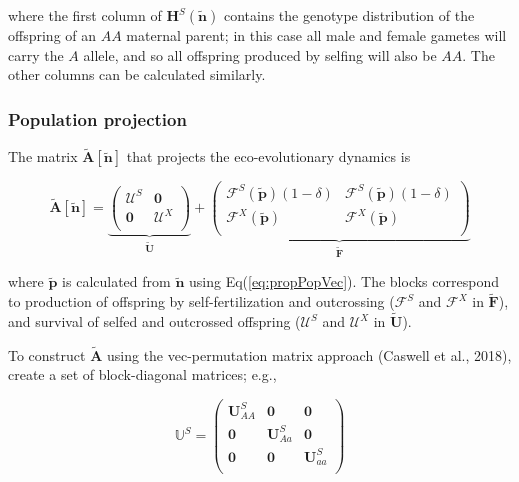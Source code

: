 \documentclass[11pt]{article}
\def\mbf#1{\mathbf{#1}}
\def\mbb#1{\mathbb{#1}}
\def\mcal#1{\mathcal{#1}}
\begin{document}
\noindent where the first column of $\mbf{H}^S(\tilde{\mbf{n}})$ contains the genotype distribution of the offspring of an $AA$ maternal parent; in this case all male and female gametes will carry the $A$ allele, and so all offspring produced by selfing will also be $AA$. The other columns can be calculated similarly.


\subsubsection*{Population projection}

The matrix $\tilde{\mbf{A}}[\tilde{\mbf{n}}]$ that projects the eco-evolutionary dynamics is

\begin{equation}
	\tilde{\mbf{A}}[\tilde{\mbf{n}}] = 
			\underbrace{\left(
			\begin{array}{c|c}
				\mcal{U}^S & \mbf{0} \\ \hline
				\mbf{0} & \mcal{U}^X \\
			\end{array} \right)}_{\tilde{\mbf{U}}} + 
			\underbrace{\left(
			\begin{array}{c|c}
				\mcal{F}^S(\tilde{\mbf{p}}) (1 - \delta) & \mcal{F}^S(\tilde{\mbf{p}}) (1 - \delta) \\ \hline
				\mcal{F}^X(\tilde{\mbf{p}}) & \mcal{F}^X(\tilde{\mbf{p}}) \\
			\end{array} \right)}_{\tilde{\mbf{F}}}
\end{equation}

\noindent where $\tilde{\mbf{p}}$ is calculated from $\tilde{\mbf{n}}$ using Eq(\ref{eq:propPopVec}). The blocks correspond to production of offspring by self-fertilization and outcrossing ($\mcal{F}^S$ and $\mcal{F}^X$ in $\tilde{\mbf{F}}$), and survival of selfed and outcrossed offspring ($\mcal{U}^S$ and $\mcal{U}^X$ in $\tilde{\mbf{U}}$). 


To construct $\tilde{\mbf{A}}$ using the vec-permutation matrix approach (Caswell et al., 2018), create a set of block-diagonal matrices; e.g.,

\begin{equation}
	\mbb{U}^S = 
		\left(
			\begin{array}{ccc}
				\mbf{U}^{S}_{AA} & \mbf{0} & \mbf{0} \\
				\mbf{0} & \mbf{U}^{S}_{Aa} & \mbf{0} \\
				\mbf{0} & \mbf{0} & \mbf{U}^{S}_{aa} \\
			\end{array} \right)
\end{equation}
\end{document}
